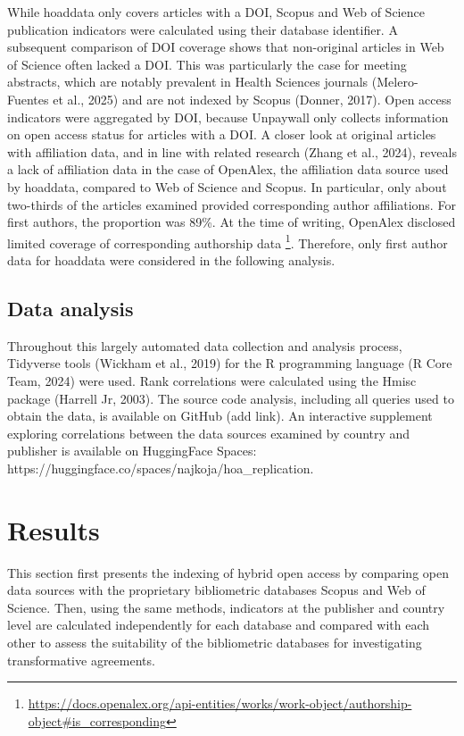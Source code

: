 \documentclass[a4paper,man,floatsintext,longtable,noextraspace,10pt]{apa6}
\begin{document}
While hoaddata only covers articles with a DOI, Scopus and Web of
Science publication indicators were calculated using their database
identifier. A subsequent comparison of DOI coverage shows that
non-original articles in Web of Science often lacked a DOI. This was
particularly the case for meeting abstracts, which are notably prevalent
in Health Sciences journals (Melero-Fuentes et al., 2025) and are not
indexed by Scopus (Donner, 2017). Open access indicators were aggregated
by DOI, because Unpaywall only collects information on open access
status for articles with a DOI. A closer look at original articles with
affiliation data, and in line with related research (Zhang et al.,
2024), reveals a lack of affiliation data in the case of OpenAlex, the
affiliation data source used by hoaddata, compared to Web of Science and
Scopus. In particular, only about two-thirds of the articles examined
provided corresponding author affiliations. For first authors, the
proportion was 89\%. At the time of writing, OpenAlex disclosed limited
coverage of corresponding authorship data \footnote{\url{https://docs.openalex.org/api-entities/works/work-object/authorship-object\#is_corresponding}}.
Therefore, only first author data for hoaddata were considered in the
following analysis.

\subsection{Data analysis}\label{data-analysis}

Throughout this largely automated data collection and analysis process,
Tidyverse tools (Wickham et al., 2019) for the R programming language (R
Core Team, 2024) were used. Rank correlations were calculated using the
Hmisc package (Harrell Jr, 2003). The source code analysis, including
all queries used to obtain the data, is available on GitHub (add link).
An interactive supplement exploring correlations between the data
sources examined by country and publisher is available on HuggingFace
Spaces: https://huggingface.co/spaces/najkoja/hoa\_replication.

\section{Results}\label{results}

This section first presents the indexing of hybrid open access by
comparing open data sources with the proprietary bibliometric databases
Scopus and Web of Science. Then, using the same methods, indicators at
the publisher and country level are calculated independently for each
database and compared with each other to assess the suitability of the
bibliometric databases for investigating transformative agreements.
\end{document}
